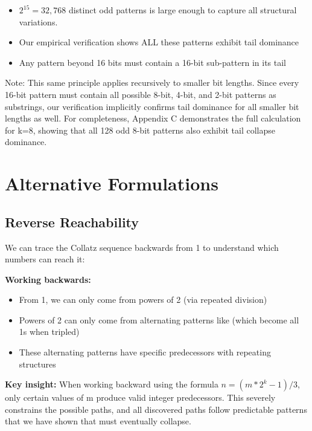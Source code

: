 \documentclass[10pt,letterpaper]{article}
\begin{document}
\begin{itemize}
    \item $2^{15}=32,768$ distinct odd patterns is large enough to capture all structural variations.
    \item Our empirical verification shows ALL these patterns exhibit tail dominance
    \item Any pattern beyond 16 bits must contain a 16-bit sub-pattern in its tail
\end{itemize}

Note: This same principle applies recursively to smaller bit lengths. Since every 16-bit pattern must contain all possible 8-bit, 4-bit, and 2-bit patterns as substrings, our verification implicitly confirms tail dominance for all smaller bit lengths as well. For completeness, Appendix C demonstrates the full calculation for k=8, showing that all 128 odd 8-bit patterns also exhibit tail collapse dominance.

\newpage

\section{Alternative Formulations}

\subsection{Reverse Reachability}
We can trace the Collatz sequence backwards from 1 to understand which numbers can reach it:

\vspace{1em}

\vspace{1em}

\textbf{Working backwards:}

\begin{itemize}
    \item From 1, we can only come from powers of 2 (via repeated division)
    \item Powers of 2 can only come from alternating patterns like  (which become all 1s when tripled)
    \item These alternating patterns have specific predecessors with repeating structures
\end{itemize}

\textbf{Key insight:} When working backward using the formula $n = (m *2^k - 1)/3$, only certain values of m produce valid integer predecessors. This severely constrains the possible paths, and all discovered paths follow predictable patterns that we have shown that must eventually collapse.
\end{document}
